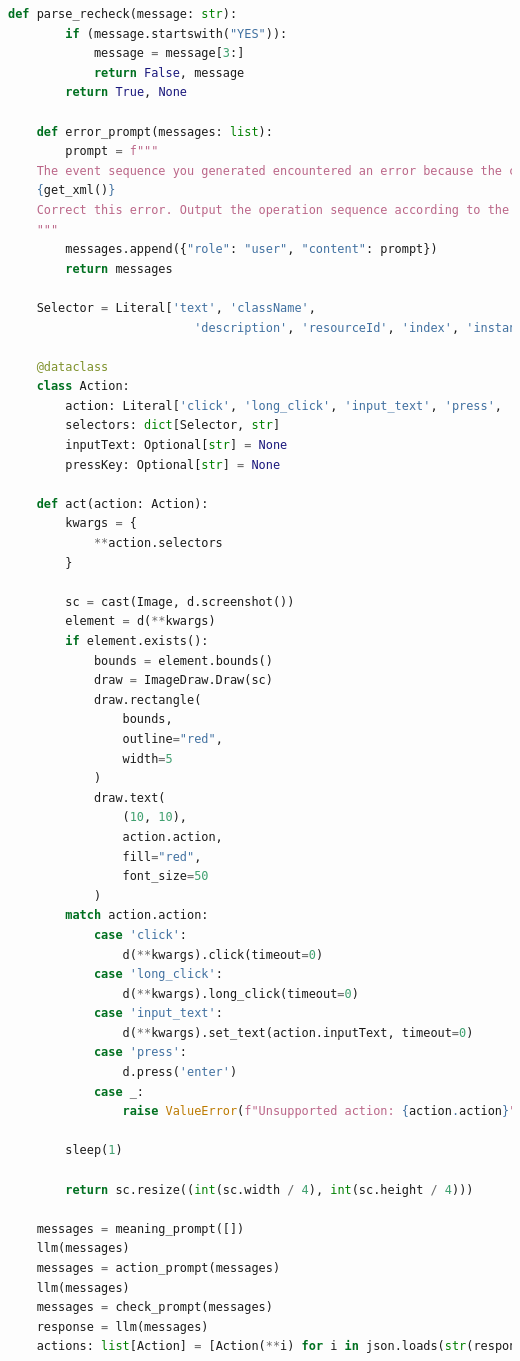 \documentclass{article}
\begin{document}
\begin{lstlisting}[language=Python]
    def parse_recheck(message: str):
        if (message.startswith("YES")):
            message = message[3:]
            return False, message
        return True, None
    
    def error_prompt(messages: list):
        prompt = f"""
    The event sequence you generated encountered an error because the corresponding element could not be found. This is the current XML representation of the application. 
    {get_xml()}
    Correct this error. Output the operation sequence according to the previous rules.
    """
        messages.append({"role": "user", "content": prompt})
        return messages
    
    Selector = Literal['text', 'className',
                          'description', 'resourceId', 'index', 'instance']
    
    @dataclass
    class Action:
        action: Literal['click', 'long_click', 'input_text', 'press', 'swipe', 'scroll']
        selectors: dict[Selector, str]
        inputText: Optional[str] = None
        pressKey: Optional[str] = None
    
    def act(action: Action):
        kwargs = {
            **action.selectors
        }
        
        sc = cast(Image, d.screenshot())
        element = d(**kwargs)
        if element.exists():
            bounds = element.bounds()
            draw = ImageDraw.Draw(sc)
            draw.rectangle(
                bounds,
                outline="red",
                width=5
            )
            draw.text(
                (10, 10),
                action.action,
                fill="red",
                font_size=50
            )
        match action.action:
            case 'click':
                d(**kwargs).click(timeout=0)
            case 'long_click':
                d(**kwargs).long_click(timeout=0)
            case 'input_text':
                d(**kwargs).set_text(action.inputText, timeout=0)
            case 'press':
                d.press('enter')
            case _:
                raise ValueError(f"Unsupported action: {action.action}")
            
        sleep(1)
            
        return sc.resize((int(sc.width / 4), int(sc.height / 4)))
    
    messages = meaning_prompt([])
    llm(messages)
    messages = action_prompt(messages)
    llm(messages)
    messages = check_prompt(messages)
    response = llm(messages)
    actions: list[Action] = [Action(**i) for i in json.loads(str(response.content))]
    

\end{lstlisting}
\end{document}
